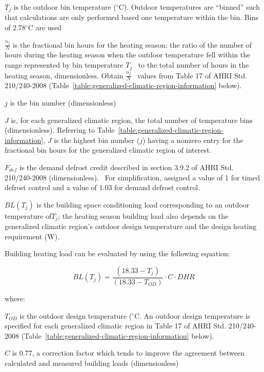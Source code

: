 \({T_j}\) is the outdoor bin temperature (\(^{\circ}\)C). Outdoor temperatures are ``binned'' such that calculations are only performed based one temperature within the bin. Bins of 2.78\(^{\circ}\)C are used

\(\frac{{{n_j}}}{N}\) is the fractional bin hours for the heating season; the ratio of the number of hours during the heating season when the outdoor temperature fell within the range represented by bin temperature \({T_j}\) ~to the total number of hours in the heating season, dimensionless. Obtain \(\frac{{{n_j}}}{N}\) ~values from Table 17 of AHRI Std. 210/240-2008 (Table~\ref{table:generalized-climatic-region-information} below).

\(j\) is the bin number (dimensionless)

\(J\) is, for each generalized climatic region, the total number of temperature bins (dimensionless). Referring to Table~\ref{table:generalized-climatic-region-information}, \(J\) is the highest bin number (\(j\)) having a nonzero entry for the fractional bin hours for the generalized climatic region of interest.

\({F_{def}}\) is the demand defrost credit described in section 3.9.2 of AHRI Std. 210/240-2008 (dimensionless).~ For simplification, assigned a value of 1 for timed defrost control and a value of 1.03 for demand defrost control.

\(BL({T_j})\) is the building space conditioning load corresponding to an outdoor temperature of\({T_j}\); the heating season building load also depends on the generalized climatic region's outdoor design temperature and the design heating requirement (W).

Building heating load can be evaluated by using the following equation:

\begin{equation}
  BL({T_j}) = \frac{{\left( {18.33 - {T_j}} \right)}}{{\left( {18.33 - {T_{OD}}} \right)}} \cdot C \cdot DHR
\end{equation}

where:

\(T_{OD}\) is the outdoor design temperature (\(^{\circ}\)C. An outdoor design temperature is specified for each generalized climatic region in Table 17 of AHRI Std. 210/240-2008 (Table~\ref{table:generalized-climatic-region-information} below).

\(C\) is 0.77, a correction factor which tends to improve the agreement between calculated and measured building loads (dimensionless)

